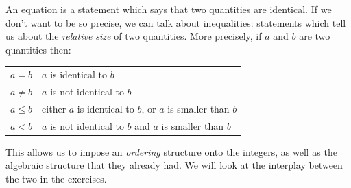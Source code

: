 



An equation is a statement which says that two quantities are identical. If we don't want to be so precise, we can talk about
inequalities: statements which tell us about the \emph{relative size} of two quantities. More precisely, if $ a $ and $ b $
are two quantities then:
\begin{center}
  \begin{tabular}{cl}
    $ a = b $ & $ a $ is identical to $ b $\\
    $ a \neq b $ & $ a $ is not identical to $ b $\\
    $ a \leq b $ & either $ a $ is identical to $ b $, or $ a $ is smaller than $ b $\\
    $ a < b $ & $ a $ is not identical to $ b $ and $ a $ is smaller than $ b $
  \end{tabular}
\end{center}

This allows us to impose an \emph{ordering} structure onto the integers, as well as the algebraic structure that they already
had. We will look at the interplay between the two in the exercises.

